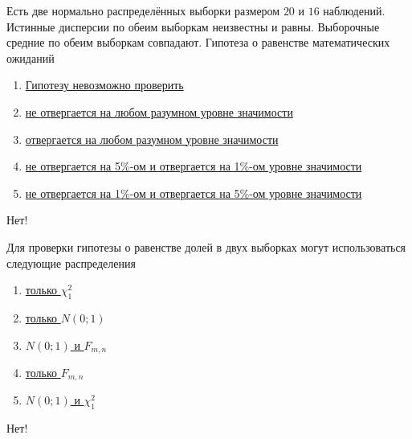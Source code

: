 \documentclass[t]{beamer}
\begin{document}
 \begin{frame} \label{7-No} 
\begin{block}{7} 

   Есть две нормально распределённых выборки размером $20$ и $16$ наблюдений. Истинные дисперсии по обеим выборкам неизвестны и равны. Выборочные средние по обеим выборкам совпадают. Гипотеза о равенстве математических ожиданий
  


 \end{block} 
\begin{enumerate} 
\item[] \hyperlink{7-No}{\beamergotobutton{} Гипотезу невозможно проверить}
\item[] \hyperlink{7-Yes}{\beamergotobutton{} не отвергается на любом разумном уровне значимости}
\item[] \hyperlink{7-No}{\beamergotobutton{} отвергается на любом разумном уровне значимости}
\item[] \hyperlink{7-No}{\beamergotobutton{} не отвергается на 5\%-ом и отвергается на 1\%-ом уровне значимости}
\item[] \hyperlink{7-No}{\beamergotobutton{} не отвергается на 1\%-ом и отвергается на 5\%-ом уровне значимости}
\end{enumerate} 

 \alert{Нет!} 
\end{frame} 


 \begin{frame} \label{8-No} 
\begin{block}{8} 

  Для проверки гипотезы о равенстве долей в двух выборках  могут использоваться следующие распределения
  


 \end{block} 
\begin{enumerate} 
\item[] \hyperlink{8-No}{\beamergotobutton{} только $\chi^2_1$}
\item[] \hyperlink{8-No}{\beamergotobutton{} только $N(0;1)$}
\item[] \hyperlink{8-No}{\beamergotobutton{} $N(0;1)$ и $F_{m,n}$}
\item[] \hyperlink{8-No}{\beamergotobutton{} только $F_{m,n}$}
\item[] \hyperlink{8-Yes}{\beamergotobutton{} $N(0;1)$ и $\chi^2_1$}
\end{enumerate} 

 \alert{Нет!} 
\end{frame} 
\end{document}

